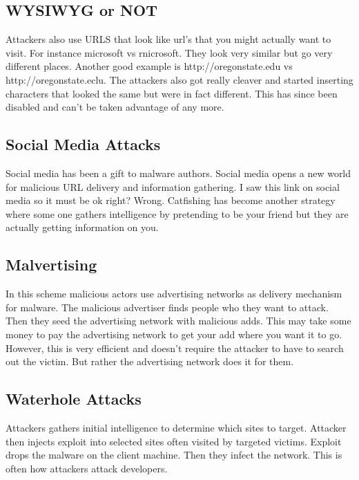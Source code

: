 \documentclass[letterpaper, onecolumn,10pt]{IEEEtran}
\begin{document}
                \subsection{WYSIWYG or NOT}
                Attackers also use URLS that look like url's that you might actually want to visit. For instance microsoft vs rnicrosoft. They look very similar but go very different places. Another good example is http://oregonstate.edu vs http://oregonstate.eclu. The attackers also got really cleaver and started inserting characters that looked the same but were in fact different. This has since been disabled and can't be taken advantage of any more.\\
                
                \subsection{Social Media Attacks}
                Social media has been a gift to malware authors. Social media opens a new world for malicious URL delivery and information gathering. I saw this link on social media so it must be ok right? Wrong. Catfishing has become another strategy where some one gathers intelligence by pretending to be your friend but they are actually getting information on you.\\
                
                \subsection{Malvertising}
                In this scheme malicious actors use advertising networks as delivery mechanism for malware. The malicious advertiser finds people who they want to attack. Then they seed the advertising network with malicious adds. This may take some money to pay the advertising network to get your add where you want it to go. However, this is very efficient and doesn't require the attacker to have to search out the victim. But rather the advertising network does it for them.\\
                
                \subsection{Waterhole Attacks}
                Attackers gathers initial intelligence to determine which sites to target. Attacker then injects exploit into selected sites often visited by targeted victims. Exploit drops the malware on the client machine. Then they infect the network. This is often how attackers attack developers.\\
                
\end{document}
